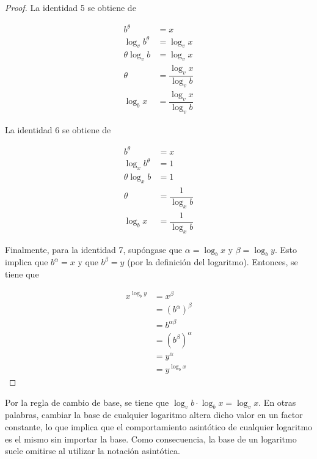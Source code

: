 \begin{proof}
    La identidad 5 se obtiene de
    
    \begin{align*}
        b^{\theta} &= x\\
        \log_{v}b^{\theta} &= \log_{v}x\\
        \theta\log_{v}b &= \log_{v}x\\
        \theta &= \dfrac{\log_{v}x}{\log_{v}b}\\
        \log_{b}x &= \dfrac{\log_{v}x}{\log_{v}b}
    \end{align*}
    
    La identidad 6 se obtiene de
    
    \begin{align*}
        b^{\theta} &= x\\
        \log_{x}b^{\theta} &= 1\\
        \theta\log_{x}b &= 1\\
        \theta &= \dfrac{1}{\log_{x}b}\\
        \log_{b}x &= \dfrac{1}{\log_{x}b}
    \end{align*}
    
    Finalmente, para la identidad 7, supóngase que $\alpha=\log_{b}x$
    y $\beta=\log_{b}y$. Esto implica que $b^{\alpha}=x$ y que $b^{\beta}=y$
    (por la definición del logaritmo). Entonces, se tiene que
    
    \begin{align*}
        x^{\log_{b}y} & =x^{\beta}\\
        &= (b^{\alpha})^{\beta}\\
        &= b^{\alpha\beta}\\
        &= (b^{\beta})^{\alpha}\\
        &= y^{\alpha}\\
        &= y^{\log_{b}x}
    \end{align*}
\end{proof}

\begin{rem}
    Por la regla de cambio de base, se tiene que $\log_{v}b\cdot\log_{b}x=\log_{v}x$.
    En otras palabras, cambiar la base de cualquier logaritmo altera dicho
    valor en un factor constante, lo que implica que el comportamiento
    asintótico de cualquier logaritmo es el mismo sin importar la base. Como 
    consecuencia, la base de un logaritmo suele omitirse al utilizar la notación 
    asintótica.
\end{rem}

